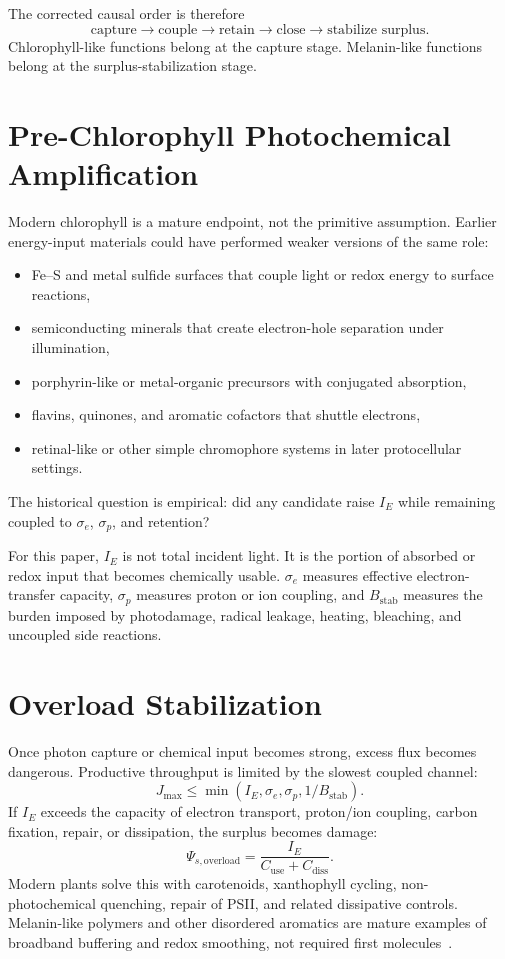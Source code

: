\documentclass[11pt,a4paper]{article}
\begin{document}
The corrected causal order is therefore
\begin{equation}
\text{capture}\rightarrow\text{couple}\rightarrow\text{retain}
\rightarrow\text{close}\rightarrow\text{stabilize surplus}.
\end{equation}
Chlorophyll-like functions belong at the capture stage. Melanin-like functions belong at the surplus-stabilization stage.

\section{Pre-Chlorophyll Photochemical Amplification}
Modern chlorophyll is a mature endpoint, not the primitive assumption. Earlier energy-input materials could have performed weaker versions of the same role:
\begin{itemize}
 \item Fe--S and metal sulfide surfaces that couple light or redox energy to surface reactions,
 \item semiconducting minerals that create electron-hole separation under illumination,
 \item porphyrin-like or metal-organic precursors with conjugated absorption,
 \item flavins, quinones, and aromatic cofactors that shuttle electrons,
 \item retinal-like or other simple chromophore systems in later protocellular settings.
\end{itemize}
The historical question is empirical: did any candidate raise $I_E$ while remaining coupled to $\sigma_e$, $\sigma_p$, and retention?

For this paper, $I_E$ is not total incident light. It is the portion of absorbed or redox input that becomes chemically usable. $\sigma_e$ measures effective electron-transfer capacity, $\sigma_p$ measures proton or ion coupling, and $B_{\mathrm{stab}}$ measures the burden imposed by photodamage, radical leakage, heating, bleaching, and uncoupled side reactions.

\section{Overload Stabilization}
Once photon capture or chemical input becomes strong, excess flux becomes dangerous. Productive throughput is limited by the slowest coupled channel:
\begin{equation}
 J_{\max}\leq \min(I_E,\sigma_e,\sigma_p,1/B_{\mathrm{stab}}).
\end{equation}
If $I_E$ exceeds the capacity of electron transport, proton/ion coupling, carbon fixation, repair, or dissipation, the surplus becomes damage:
\begin{equation}
 \Psi_{s,\mathrm{overload}}
 =
 \frac{I_E}{C_{\mathrm{use}}+C_{\mathrm{diss}}}.
\end{equation}
Modern plants solve this with carotenoids, xanthophyll cycling, non-photochemical quenching, repair of PSII, and related dissipative controls. Melanin-like polymers and other disordered aromatics are mature examples of broadband buffering and redox smoothing, not required first molecules~\cite{Cleaves2008,Higgs2015}.
\end{document}
